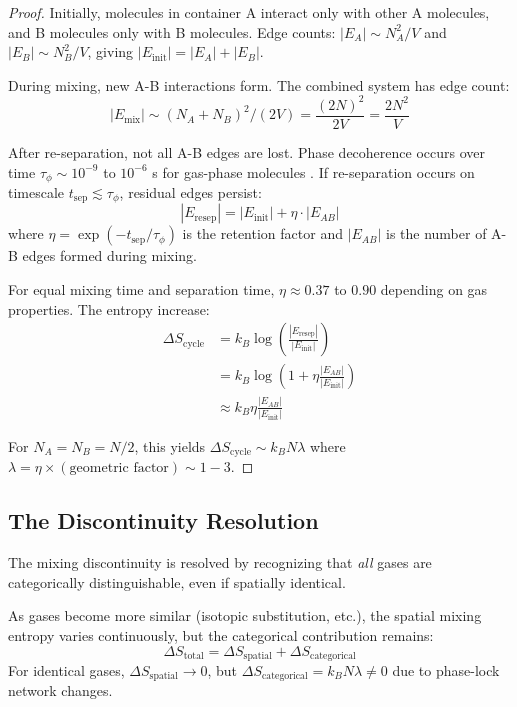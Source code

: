 \begin{proof}
Initially, molecules in container A interact only with other A molecules, and B molecules only with B molecules. Edge counts: $|E_A| \sim N_A^2 / V$ and $|E_B| \sim N_B^2 / V$, giving $|E_{\text{init}}| = |E_A| + |E_B|$.

During mixing, new A-B interactions form. The combined system has edge count:
\begin{equation}
|E_{\text{mix}}| \sim (N_A + N_B)^2 / (2V) = \frac{(2N)^2}{2V} = \frac{2N^2}{V}
\end{equation}

After re-separation, not all A-B edges are lost. Phase decoherence occurs over time $\tau_{\phi} \sim 10^{-9}$ to $10^{-6}$ s for gas-phase molecules \cite{plenio2013}. If re-separation occurs on timescale $t_{\text{sep}} \lesssim \tau_{\phi}$, residual edges persist:
\begin{equation}
|E_{\text{resep}}| = |E_{\text{init}}| + \eta \cdot |E_{AB}|
\end{equation}
where $\eta = \exp(-t_{\text{sep}}/\tau_{\phi})$ is the retention factor and $|E_{AB}|$ is the number of A-B edges formed during mixing.

For equal mixing time and separation time, $\eta \approx 0.37$ to $0.90$ depending on gas properties. The entropy increase:
\begin{align}
\Delta S_{\text{cycle}} &= k_B \log\left(\frac{|E_{\text{resep}}|}{|E_{\text{init}}|}\right) \\
&= k_B \log\left(1 + \eta \frac{|E_{AB}|}{|E_{\text{init}}|}\right) \\
&\approx k_B \eta \frac{|E_{AB}|}{|E_{\text{init}}|}
\end{align}

For $N_A = N_B = N/2$, this yields $\Delta S_{\text{cycle}} \sim k_B N \lambda$ where $\lambda = \eta \times (\text{geometric factor}) \sim 1-3$.
\end{proof}

\subsection{The Discontinuity Resolution}

The mixing discontinuity is resolved by recognizing that \emph{all} gases are categorically distinguishable, even if spatially identical.

\begin{corollary}
As gases become more similar (isotopic substitution, etc.), the spatial mixing entropy varies continuously, but the categorical contribution remains:
\begin{equation}
\Delta S_{\text{total}} = \Delta S_{\text{spatial}} + \Delta S_{\text{categorical}}
\end{equation}
For identical gases, $\Delta S_{\text{spatial}} \to 0$, but $\Delta S_{\text{categorical}} = k_B N \lambda \neq 0$ due to phase-lock network changes.
\end{corollary}

